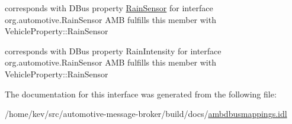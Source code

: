 corresponds with D\+Bus property \hyperlink{interfaceRainSensor}{Rain\+Sensor} for interface org.\+automotive.\+Rain\+Sensor A\+M\+B fulfills this member with Vehicle\+Property\+::\+Rain\+Sensor 

corresponds with D\+Bus property Rain\+Intensity for interface org.\+automotive.\+Rain\+Sensor A\+M\+B fulfills this member with Vehicle\+Property\+::\+Rain\+Sensor 

The documentation for this interface was generated from the following file\+:\begin{DoxyCompactItemize}
\item 
/home/kev/src/automotive-\/message-\/broker/build/docs/\hyperlink{ambdbusmappings_8idl}{ambdbusmappings.\+idl}\end{DoxyCompactItemize}
